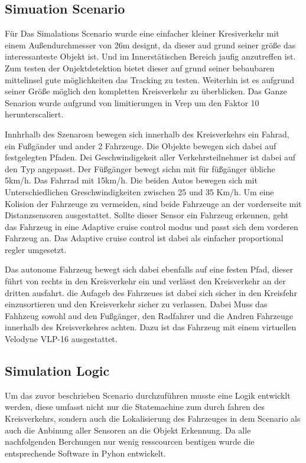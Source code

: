 \documentclass[11pt,oneside,openright]{mpreport}
\begin{document}
\subsection{Simuation Scenario}
Für Das Simalations Scenario wurde eine einfacher kleiner Kresiverkehr mit einem Außendurchmesser von 26m designt, da dieser aud grund seiner größe das interessanteste Objekt ist.
Und im Innerstätischen Bereich jaufig anzutreffen ist. Zum testen der Onjektdetektion bietet dieser auf grund seiner bebaubaren mittelinsel gute möglichkeiten das Tracking zu testen.
Weiterhin ist es aufgrund seiner Größe möglich den kompletten Kreisverkehr zu überblicken. Das Ganze Senarion wurde aufgrund von limitierungen in Vrep um den Faktor 10 herunterscaliert.

Innhrhalb des Szenarosn bewegen sich innerhalb des Kreisverkehrs ein Fahrad, ein Fußgänder und ander 2 Fahrzeuge. Die Objekte bewegen sich dabei auf festgelegten Pfaden.
Dei Geschwindigekeit aller Verkehrsteilnehmer ist dabei auf den Typ angepasst. Der Füßgänger bewegt sichn mit für füßgänger übliche 5km/h.
Das Fahrrad mit 15km/h. Die beiden Autos bewegen sich mit Unterschiedlichen Greschwindigkeiten zwischen 25 und 35 Km/h. Um eine Kolision der Fahrzeuge zu vermeiden, sind beide 
Fahrzeuge an der vorderseite mit Distanzsensoren ausgestattet. Sollte dieser Sensor ein Fahrzeug erkennen, geht das Fahrzeug in eine  Adaptive cruise control modus und
passt sich dem vorderen Fahrzeug an. Das Adaptive cruise control ist dabei als einfacher proportional regler umgesetzt.

Das autonome Fahrzeug bewegt sich dabei ebenfalls auf eine festen Pfad, dieser führt von rechts in den Kreisverkehr ein und verlässt den Kreisverkehr an der dritten ausfahrt.
die Aufageb des Fahrzeues ist dabei sich sicher in den Kreisfehr einzusortieren und den Kreisverkehr sicher zu verlassen. Dabei Muss das Fahhzeug sowohl aud den Fußgänger, den Radfahrer
und die Andren Fahrzeuge innerhalb des Kreisverkehres achten. Dazu ist das Fahrzeug mit einem virtuellen Velodyne VLP-16 ausgestattet.

\subsection{Simulation Logic}

Um das zuvor beschrieben Scenario durchzuführen musste eine Logik entwicklt werden, diese umfasst nicht nur die Statemachine zum durch fahren des Kreisverkehrs, sondern
auch die Lokalisierung des Fahrzeuges in dem Scenario als auch die Anbinung aller Sensoren an die Objekt Erkennung. Da alle nachfolgenden Berchungen nur wenig resscourcen bentigen
wurde die entsprechende Software in Pyhon entwickelt.
\end{document}
